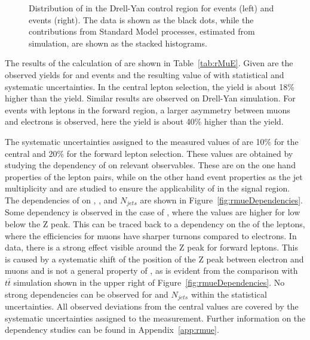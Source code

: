 \begin{figure}[htbp]
\begin{minipage}[t]{0.49\textwidth}
\end{minipage}
\caption{Distribution of \mll in the Drell-Yan control region for \MM events (left) and \EE events (right). The data is shown as the black dots, while the contributions from Standard Model processes, estimated from simulation, are shown as the stacked histograms.}
\label{fig:rmueMll}
\end{figure} 
The results of the calculation of \rmue are shown in Table~\ref{tab:rMuE}. Given are the observed yields for \MM and \EE events and the resulting value of \rmue with statistical and systematic uncertainties. In the central lepton selection, the \MM yield is about 18\% higher than the \EE yield. Similar results are observed on Drell-Yan simulation. For events with leptons in the forward region, a larger asymmetry between muons and electrons is observed, here the \MM yield is about 40\% higher than the \EE yield. 

The systematic uncertainties assigned to the measured values of \rmue are 10\% for the central and 20\% for the forward lepton selection. These values are obtained by studying the dependency of \rmue on relevant observables. These are on the one hand properties of the lepton pairs, while on the other hand event properties as the jet multiplicity and \MET are studied to ensure the applicability of \rmue in the signal region. The dependencies of \rmue on \mll, \MET, and $N_{jets}$ are shown in Figure~\ref{fig:rmueDependencies}. Some dependency is observed in the case of \mll, where the values are higher for low \mll below the Z peak. This can be traced back to a dependency on the \pt of the leptons, where the efficiencies for muons have sharper turnons compared to electrons. In data, there is a strong effect visible around the Z peak for forward leptons. This is caused by a systematic shift of the position of the Z peak between electron and muons and is not a general property of \rmue, as is evident from the comparison with $t\bar{t}$ simulation shown in the upper right of Figure~\ref{fig:rmueDependencies}. No strong dependencies can be observed for \MET and $N_{jets}$ within the statistical uncertainties. All observed deviations from the central values are covered by the systematic uncertainties assigned to the measurement. Further information on the dependency studies can be found in Appendix~\ref{app:rmue}.
